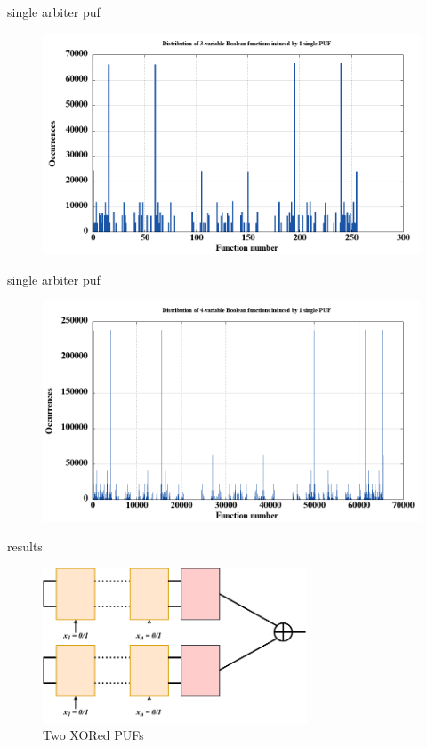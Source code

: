 \documentclass[10pt, compress]{beamer}
\begin{document}
\begin{frame}{single arbiter puf}
    \begin{figure}
        \centering
        \includegraphics[width=\textwidth]{figures/dist/distribution_of_3-variable_boolean_functions_induced_by_1_single_puf.png}
    \end{figure}
\end{frame}

\begin{frame}{single arbiter puf}
    \begin{figure}
        \centering
        \includegraphics[width=\textwidth]{figures/dist/distribution_of_4-variable_boolean_functions_induced_by_1_single_puf.png}
    \end{figure}
\end{frame}


\begin{frame}{results}
    \begin{figure}
        \centering
        \includegraphics[width=0.7\textwidth]{figures/puf_2_xor.pdf}
        \caption{Two XORed PUFs}
    \end{figure}
\end{frame}
\end{document}

